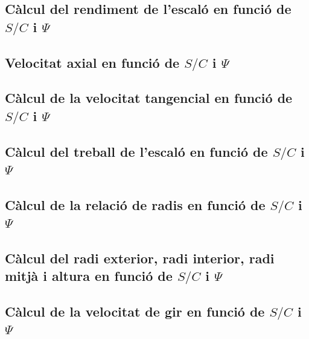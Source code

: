 \subsection{Càlcul del rendiment de l'escaló en funció de $S/C$ i $\Psi$}

\subsection{Velocitat axial en funció de $S/C$ i $\Psi$}

\subsection{Càlcul de la velocitat tangencial en funció de $S/C$ i $\Psi$}

\subsection{Càlcul del treball de l'escaló en funció de $S/C$ i $\Psi$}

\subsection{Càlcul de la relació de radis en funció de $S/C$ i $\Psi$}

\subsection{Càlcul del radi exterior, radi interior, radi mitjà i altura en funció de $S/C$ i $\Psi$}

\subsection{Càlcul de la velocitat de gir en funció de $S/C$ i $\Psi$}